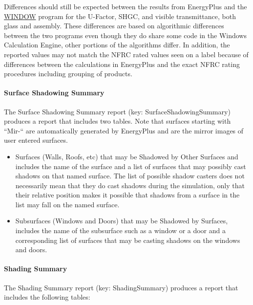 Differences should still be expected between the results from EnergyPlus and the \href{https://windows.lbl.gov/software-tools#window-heading}{WINDOW} program for the U-Factor, SHGC, and visible transmittance, both glass and assembly. These differences are based on algorithmic differences between the two programs even though they do share some code in the Windows Calculation Engine, other portions of the algorithms differ. In addition, the reported values may not match the NFRC rated values seen on a label because of differences between the calculations in EnergyPlus and the exact NFRC rating procedures including grouping of products.

\paragraph{Surface Shadowing Summary}\label{surface-shadowing-summary}

The Surface Shadowing Summary report (key: SurfaceShadowingSummary) produces a report that includes two tables. Note that surfaces starting with ``Mir-`` are automatically generated by EnergyPlus and are the mirror images of user entered surfaces.

\begin{itemize}
\item
  Surfaces (Walls, Roofs, etc) that may be Shadowed by Other Surfaces and includes the name of the surface and a list of surfaces that may possibly cast shadows on that named surface. The list of possible shadow casters does not necessarily mean that they do cast shadows during the simulation, only that their relative position makes it possible that shadows from a surface in the list may fall on the named surface.
\item
  Subsurfaces (Windows and Doors) that may be Shadowed by Surfaces, includes the name of the subsurface such as a window or a door and a corresponding list of surfaces that may be casting shadows on the windows and doors.
\end{itemize}

\paragraph{Shading Summary}\label{shading-summary}

The Shading Summary report (key: ShadingSummary) produces a report that includes the following tables:

